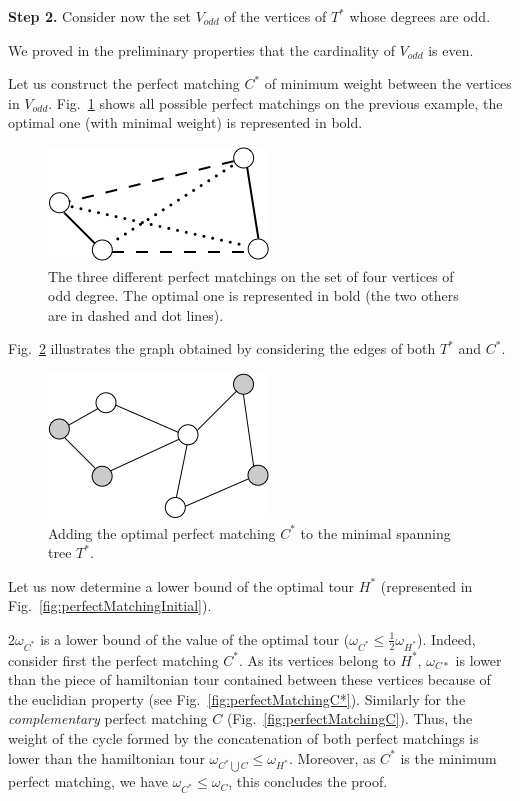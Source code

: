 \textbf{Step 2.} Consider now the set $V_{odd}$ of the vertices of $T^*$ whose degrees are odd. 

We proved in the preliminary properties that the cardinality of $V_{odd}$ is even. 

Let us construct the perfect matching $C^*$ of minimum weight between the vertices in $V_{odd}$. 
Fig.~\ref{fig:AllPerfectMatchings} shows all possible perfect matchings on the previous example, the optimal one (with minimal weight) is represented in bold. 
\begin{figure}[h]
\begin{center}
       \includegraphics[scale=0.6]{FiguresGraph/perfectmatchingAll}
       \caption{The three different perfect matchings on the set of four vertices of odd degree.
       The optimal one is represented in bold (the two others are in dashed and dot lines).}
              \label{fig:AllPerfectMatchings}
\end{center}
\end{figure}

Fig.~\ref{fig:christofidesPerfectMatching} illustrates the graph obtained by considering the edges of both $T^*$ and $C^*$. 
\begin{figure}[h]
\begin{center}
       \includegraphics[scale=0.6]{FiguresGraph/christofides3}
       \caption{Adding the optimal perfect matching $C^*$ to the minimal spanning tree $T^*$.}
              \label{fig:christofidesPerfectMatching}
\end{center}
\end{figure}

Let us now determine a lower bound of the optimal tour $H^*$ (represented in Fig.~\ref{fig:perfectMatchingInitial}).

$2 \omega_{C^*}$ is a lower bound of the value of the optimal tour ($\omega_{C^*} \leq \frac{1}{2} \omega_{H^*}$). 
Indeed, consider first the perfect matching $C^*$.
As its vertices belong to $H^*$, $\omega_{C*}$ is lower than the piece of hamiltonian tour contained between these vertices
because of the euclidian property (see Fig.~\ref{fig:perfectMatchingC*}).
Similarly for the \textit{complementary} perfect matching $C$ (Fig.~\ref{fig:perfectMatchingC}).  
Thus, the weight of the cycle formed by the concatenation of both perfect matchings is lower than the hamiltonian tour $\omega_{C^* \bigcup C} \leq \omega_{H^*}$.
Moreover, as $C^*$ is the minimum perfect matching, we have $\omega_{C^*} \leq \omega_{C}$, this concludes the proof.


